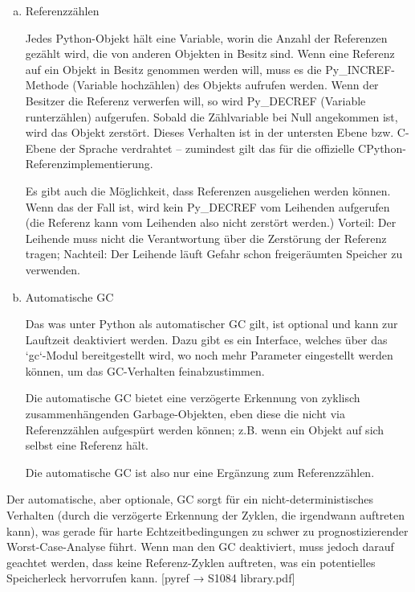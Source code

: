 \begin{enumerate}[(a)]

  \item Referenzzählen

        Jedes Python-Objekt hält eine Variable, worin die Anzahl der
        Referenzen gezählt wird, die von anderen Objekten in Besitz sind.
        Wenn eine Referenz auf ein Objekt in Besitz genommen werden will,
        muss es die Py\_INCREF-Methode (Variable hochzählen) des Objekts
        aufrufen werden. Wenn der Besitzer die Referenz verwerfen will, so
        wird Py\_DECREF (Variable runterzählen) aufgerufen. Sobald die
        Zählvariable bei Null angekommen ist, wird das Objekt zerstört.
        Dieses Verhalten ist in der untersten Ebene bzw. C-Ebene der Sprache
        verdrahtet -- zumindest gilt das für die offizielle
        CPython-Referenzimplementierung.

        Es gibt auch die Möglichkeit, dass Referenzen ausgeliehen werden
        können. Wenn das der Fall ist, wird kein Py\_DECREF vom Leihenden
        aufgerufen (die Referenz kann vom Leihenden also nicht zerstört
        werden.) Vorteil: Der Leihende muss nicht die Verantwortung über die
        Zerstörung der Referenz tragen; Nachteil: Der Leihende läuft Gefahr
        schon freigeräumten Speicher zu verwenden.

  \item Automatische GC

        Das was unter Python als automatischer GC gilt, ist optional und
        kann zur Lauftzeit deaktiviert werden. Dazu gibt es ein Interface,
        welches über das `gc`-Modul bereitgestellt wird, wo noch mehr
        Parameter eingestellt werden können, um das GC-Verhalten
        feinabzustimmen.

        Die automatische GC bietet eine verzögerte Erkennung von zyklisch
        zusammenhängenden Garbage-Objekten, eben diese die nicht via
        Referenzzählen aufgespürt werden können; z.B. wenn ein Objekt auf
        sich selbst eine Referenz hält.

        Die automatische GC ist also nur eine Ergänzung zum Referenzzählen.

\end{enumerate}


Der automatische, aber optionale, GC sorgt für ein nicht-deterministisches
Verhalten (durch die verzögerte Erkennung der Zyklen, die irgendwann
auftreten kann), was gerade für harte Echtzeitbedingungen zu schwer zu
prognostizierender Worst-Case-Analyse führt. Wenn man den GC deaktiviert,
muss jedoch darauf geachtet werden, dass keine Referenz-Zyklen auftreten,
was ein potentielles Speicherleck hervorrufen kann. [pyref → S1084 library.pdf]


